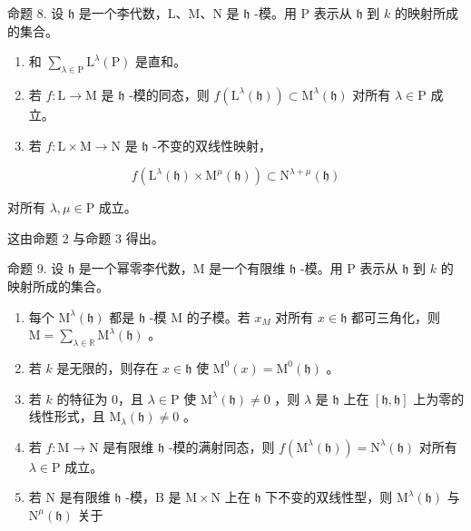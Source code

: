 命题 8. 设 \(\mathfrak{h}\) 是一个李代数，L、M、N 是 \(\mathfrak{h}\) -模。用 P 表示从 \(\mathfrak{h}\) 到 \(k\) 的映射所成的集合。

\begin{enumerate}
\def\labelenumi{(\roman{enumi})}
\item
  和 \(\sum_{\lambda \in \mathrm{P}}\mathrm{L}^{\lambda}(\mathrm{P})\) 是直和。
\item
  若 \(f: \mathrm{L} \to \mathrm{M}\) 是 \(\mathfrak{h}\) -模的同态，则 \(f(\mathrm{L}^{\lambda}(\mathfrak{h})) \subset \mathrm{M}^{\lambda}(\mathfrak{h})\) 对所有 \(\lambda \in \mathrm{P}\) 成立。
\item
  若 \(f:\mathrm{L}\times \mathrm{M}\to \mathrm{N}\) 是 \(\mathfrak{h}\) -不变的双线性映射，
\end{enumerate}

\[
f (\mathrm{L} ^ {\lambda} (\mathfrak {h}) \times \mathrm{M} ^ {\mu} (\mathfrak {h})) \subset \mathrm{N} ^ {\lambda + \mu} (\mathfrak {h})
\]

对所有 \(\lambda, \mu \in \mathrm{P}\) 成立。

这由命题 2 与命题 3 得出。

命题 9. 设 \(\mathfrak{h}\) 是一个幂零李代数，M 是一个有限维 \(\mathfrak{h}\) -模。用 P 表示从 \(\mathfrak{h}\) 到 \(k\) 的映射所成的集合。

\begin{enumerate}
\def\labelenumi{(\roman{enumi})}
\item
  每个 \(\mathrm{M}^{\lambda}(\mathfrak{h})\) 都是 \(\mathfrak{h}\) -模 \(\mathrm{M}\) 的子模。若 \(x_{M}\) 对所有 \(x\in \mathfrak{h}\) 都可三角化，则 \(\mathrm{M} = \sum_{\lambda \in \mathbb{R}}\mathrm{M}^{\lambda}(\mathfrak{h})\) 。
\item
  若 \(k\) 是无限的，则存在 \(x \in \mathfrak{h}\) 使 \(\mathrm{M}^0(x) = \mathrm{M}^0(\mathfrak{h})\) 。
\item
  若 \(k\) 的特征为 0，且 \(\lambda \in \mathrm{P}\) 使 \(\mathrm{M}^{\lambda}(\mathfrak{h}) \neq 0\) ，则 \(\lambda\) 是 \(\mathfrak{h}\) 上在 \([\mathfrak{h},\mathfrak{h}]\) 上为零的线性形式，且 \(\mathrm{M}_{\lambda}(\mathfrak{h}) \neq 0\) 。
\item
  若 \(f: \mathrm{M} \to \mathrm{N}\) 是有限维 \(\mathfrak{h}\) -模的满射同态，则 \(f(\mathrm{M}^{\lambda}(\mathfrak{h})) = \mathrm{N}^{\lambda}(\mathfrak{h})\) 对所有 \(\lambda \in \mathrm{P}\) 成立。
\item
  若 \(\mathrm{N}\) 是有限维 \(\mathfrak{h}\) -模，\(\mathrm{B}\) 是 \(\mathrm{M} \times \mathrm{N}\) 上在 \(\mathfrak{h}\) 下不变的双线性型，则 \(\mathrm{M}^{\lambda}(\mathfrak{h})\) 与 \(\mathrm{N}^{\mu}(\mathfrak{h})\) 关于
\end{enumerate}

